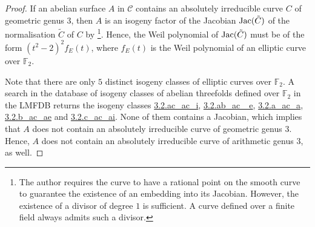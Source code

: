 \documentclass[11pt]{amsart}
\newcommand\F{\mathbb{F}}
\def\Jac{\mathop{\rm Jac}\nolimits}
\def\Jac{\mathop{\rm Jac}\nolimits}
\newcommand\cC{\mathcal{C}}
\theoremstyle{plain}
\theoremstyle{definition}
\begin{document}
\begin{proof}
    If an abelian surface $A$ in $\cC$ contains an absolutely irreducible curve $C$ of geometric genus $3$, then $A$ is an isogeny factor of the Jacobian $\Jac(\tilde C)$ of the normalisation $\tilde C$ of $C$ by \cite[Prop.~2]{Haloui17}\footnote{The author requires the curve to have a rational point on the smooth curve to guarantee the existence of an embedding into its Jacobian. However, the existence of a divisor of degree $1$ is sufficient. A curve defined over a finite field always admits such a divisor.\label{footnote}}.
    Hence, the Weil polynomial of $\Jac(\tilde C)$ must be of the form $(t^2-2)^2 f_E(t)$, where $f_E(t)$ is the Weil polynomial of an elliptic curve over $\F_2$.

    Note that there are only $5$ distinct isogeny classes of elliptic curves over $\F_2$. 
    A search in the database of isogeny classes of abelian threefolds defined over $\F_2$ in the LMFDB \cite{lmfdb} returns the isogeny classes 
    \href{http://www.lmfdb.org/Variety/Abelian/Fq/3/2/ac_ac_i}{3.2.ac\_ac\_i}, 
    \href{http://www.lmfdb.org/Variety/Abelian/Fq/3/2/ab_ac_e}{3.2.ab\_ac\_ e}, 
    \href{http://www.lmfdb.org/Variety/Abelian/Fq/3/2/a_ac_a}{3.2.a\_ac\_a}, 
    \href{http://www.lmfdb.org/Variety/Abelian/Fq/3/2/b_ac_ae}{3.2.b\_ac\_ae} and 
    \href{http://www.lmfdb.org/Variety/Abelian/Fq/3/2/c_ac_ai}{3.2.c\_ac\_ai}.
    None of them contains a Jacobian, which implies that $A$ does not contain an absolutely irreducible curve of geometric genus $3$.
    Hence, $A$ does not contain an absolutely irreducible curve of arithmetic genus $3$, as well.


\end{proof}
\end{document}
